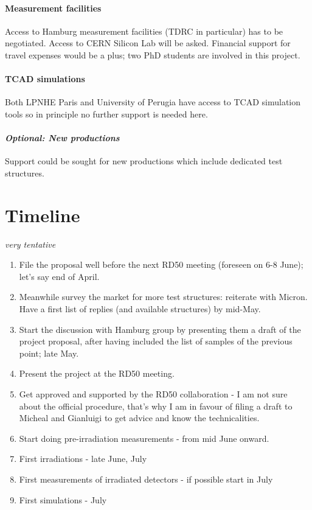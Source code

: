 \documentclass[dvips,12pt]{article}
\begin{document}
\paragraph{Measurement facilities} Access to Hamburg measurement facilities (TDRC in 
particular) has to be negotiated. Access to CERN Silicon Lab will be asked. 
Financial support for travel expenses would be a plus; two 
PhD students are involved in this project.
\paragraph{TCAD simulations}Both LPNHE Paris and University of Perugia have access to 
TCAD simulation tools so in principle no further support is needed here.
\paragraph{{\it Optional: New productions}}Support could be sought for new 
productions which include dedicated test structures.


\section{Timeline}
\label{sec:timeline}
{\it very tentative}

\begin{enumerate}[1)]
\item File the proposal well before the next RD50 meeting (foreseen on 6-8 June); let's say end of 
April.
\item Meanwhile survey the market for more test structures: reiterate with Micron. 
Have a first list of replies (and available structures) by mid-May.
\item Start the discussion with Hamburg group by presenting them a draft of the project proposal, 
after having included the list of samples of the previous point; late May.
\item Present the project at the RD50 meeting.
\item Get approved and supported by the RD50 collaboration - I am not sure about the official 
procedure, that's why I am in favour of filing a draft to Micheal and Gianluigi to get advice and know 
the technicalities.
\item Start doing pre-irradiation measurements - from mid June onward.
\item First irradiations - late June, July
\item First measurements of irradiated detectors - if possible start in July
\item First simulations - July
\end{enumerate}

\newpage



\end{document}

